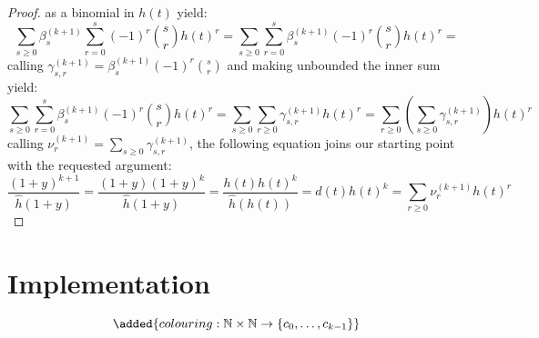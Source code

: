 \documentclass[11pt,a4paper]{article} %
\begin{document}
\begin{proof}
    as a binomial in $h(t)$ yield:
    \begin{displaymath}
        \sum_{s\geq 0}{\beta_{s}^{(k+1)} {\sum_{r=0}^{s}{(-1)^{r}{{s}\choose{r}} h(t)^{r}}}} =
        \sum_{s\geq 0}{ \sum_{r=0}^{s}{\beta_{s}^{(k+1)}(-1)^{r}{{s}\choose{r}} h(t)^{r}}} =
    \end{displaymath}
    calling $\gamma_{s,r}^{(k+1)}=\beta_{s}^{(k+1)}(-1)^{r}{{s}\choose{r}}$ and making 
    unbounded the inner sum yield: 
    \begin{displaymath}
        \sum_{s\geq 0}{ \sum_{r=0}^{s}{\beta_{s}^{(k+1)}(-1)^{r}{{s}\choose{r}} h(t)^{r}}} =
        \sum_{s\geq 0}{ \sum_{r\geq 0}{\gamma_{s,r}^{(k+1)} h(t)^{r}}} =
        \sum_{r\geq 0}{ \left(\sum_{s\geq 0}{\gamma_{s,r}^{(k+1)} }\right) h(t)^{r}}
    \end{displaymath}
    calling $\nu_{r}^{(k+1)}=\sum_{s\geq 0}{\gamma_{s,r}^{(k+1)} }$, the following equation
    joins our starting point with the requested argument:
    \begin{displaymath}
        \frac{(1+y)^{k+1}}{ \hat{h}(1+y)} = 
        \frac{(1+y)(1+y)^{k}}{ \hat{h}(1+y)} = 
        \frac{h(t)h(t)^{k}}{ \hat{h}(h(t))} = 
        d(t)h(t)^{k} = \sum_{r\geq 0}{ \nu_{r}^{(k+1)} h(t)^{r}}
    \end{displaymath}
    
    

    \end{proof}


    \section{Implementation}

    \begin{displaymath}
    \added{
        colouring : \mathbb{N} \times\mathbb{N} \rightarrow \lbrace c_0, \ldots, c_{k-1} \rbrace
    }
    \end{displaymath}
\end{document}

